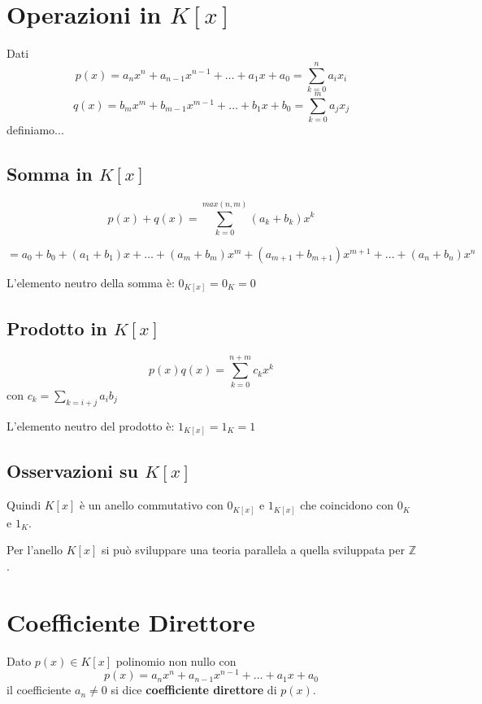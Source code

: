 \documentclass[a4paper,12pt, oneside]{book}
\begin{document}
	\section{Operazioni in $K[x]$}
		Dati
		$$p(x) = a_{n}x^{n} + a_{n-1}x^{n-1} + \dots + a_{1}x + a_{0} = \sum_{k=0}^{n} a_i x_i$$
		$$q(x) = b_{m}x^{m} + b_{m-1}x^{m-1} + \dots + b_{1}x + b_{0} = \sum_{k=0}^{m} a_j x_j$$
		definiamo...
		\subsection{Somma in $K[x]$}
			$$p(x)+q(x) = \sum_{k=0}^{max(n,m)} (a_k+b_k)x^k$$
			
			$$= a_0 + b_0 + (a_1+b_1)x + \dots + (a_m+b_m)x^m + (a_{m+1}+b_{m+1})x^{m+1} + \dots + (a_n+b_n)x^n$$
			
			\begin{nota}
				L'elemento neutro della somma è: $0_{K[x]} = 0_K = 0$
			\end{nota}
			
		\subsection{Prodotto in $K[x]$}
			$$p(x)q(x) = \sum_{k=0}^{n+m} c_kx^k$$
			con $c_k = \displaystyle\sum_{k=i+j} a_ib_j$
			
			\begin{nota}
				L'elemento neutro del prodotto è: $1_{K[x]} = 1_K = 1$
			\end{nota}
			
		\subsection{Osservazioni su $K[x]$}
			
			\begin{nota}
				Quindi $K[x]$ è un anello commutativo con $0_{K[x]}$ e $1_{K[x]}$ che coincidono con $0_K$ e $1_K$.
			\end{nota}
			
			\begin{nota}
				Per l'anello $K[x]$ si può sviluppare una teoria parallela a quella sviluppata per $\mathbb{Z}$.
			\end{nota}
		
	\section{Coefficiente Direttore}
		\begin{definizione}
			Dato $p(x) \in K[x]$ polinomio non nullo con
			$$p(x) = a_{n}x^{n} + a_{n-1}x^{n-1} + \dots + a_{1}x + a_{0}$$
			il coefficiente $a_n \not = 0$ si dice \textbf{coefficiente direttore} di $p(x)$.
		\end{definizione}
		
\end{document}
